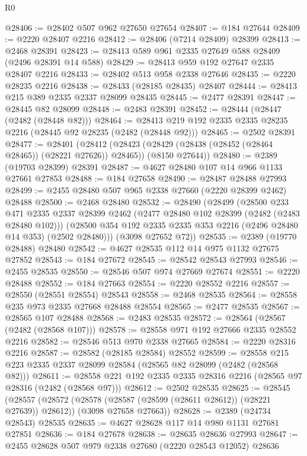 \begin{lexlean}{R0}
\begin{coremodule}
@28406 := @28402 @507 @962 @27650 @27654
@28407 := @184 @27644
@28409 := @2220 @28407 @2216
@28412 := @28406 (@7214 @28409) @28399
@28413 := @2468 @28391
@28423 := @28413 @589 @961 @2335 @27649 @588 @28409 (@2496 @28391 @14 @588)
@28429 := @28413 @959 @192 @27647 @2335 @28407 @2216
@28433 := @28402 @513 @958 @2338 @27646
@28435 := @2220 @28235 @2216
@28438 := @28433 (@28185 @28435) @28407
@28444 := @28413 @215 @389 @2335 @2337 @28099 @28435
@28445 := @2477 @28391
@28447 := @28445 @82 @28099
@28448 := @2483 @28391
@28452 := @28444 (@28447 (@2482 (@28448 @82)))
@28464 := @28413 @219 @192 @2335 @2335 @28235 @2216 (@28445 @92 @28235 (@2482 (@28448 @92)))
@28465 := @2502 @28391
@28477 := @28401
    (@28412
      (@28423 (@28429 (@28438 (@28452 (@28464 @28465)) (@28221 @27626)) @28465))
      (@8150 @27644))
@28480 := @2389 (@19703 @28399) @28391
@28487 := @4627 @28480 @107 @14 @966 @1133 @27661 @27853
@28488 := @184 @27658
@28490 := @28487 @28488 @27993
@28499 := @2455 @28480 @507 @965 @2338 @27660 (@2220 @28399 @2462) @28488
@28500 := @2468 @28480
@28532 := @28490
    (@28499
      (@28500
        @233
        @471
        @2335
        @2337
        @28399
        @2462
        (@2477 @28480 @102 @28399 (@2482 (@2483 @28480 @102)))
        (@28500 @354 @192 @2335 @2335 @353 @2216 (@2496 @28480 @14 @353) (@2502 @28480)))
      (@3098 @27652 @72))
@28535 := @2389 (@19770 @28488) @28480
@28542 := @4627 @28535 @112 @14 @975 @1132 @27675 @27852
@28543 := @184 @27672
@28545 := @28542 @28543 @27993
@28546 := @2455 @28535
@28550 := @28546 @507 @974 @27669 @27674
@28551 := @2220 @28488
@28552 := @184 @27663
@28554 := @2220 @28552 @2216
@28557 := @28550 (@28551 @28554) @28543
@28558 := @2468 @28535
@28564 := @28558 @235 @973 @2335 @27668 @28488 @28554
@28565 := @2477 @28535
@28567 := @28565 @107 @28488
@28568 := @2483 @28535
@28572 := @28564 (@28567 (@2482 (@28568 @107)))
@28578 := @28558 @971 @192 @27666 @2335 @28552 @2216
@28582 := @28546 @513 @970 @2338 @27665
@28584 := @2220 @28316 @2216
@28587 := @28582 (@28185 @28584) @28552
@28599 := @28558 @215 @223 @2335 @2337 @28099 @28584 (@28565 @82 @28099 (@2482 (@28568 @82)))
@28611 := @28558 @221 @192 @2335 @2335 @28316 @2216 (@28565 @97 @28316 (@2482 (@28568 @97)))
@28612 := @2502 @28535
@28625 := @28545
    (@28557
      (@28572 (@28578 (@28587 (@28599 (@28611 @28612)) (@28221 @27639)) @28612))
      (@3098 @27658 @27663))
@28628 := @2389 (@24734 @28543) @28535
@28635 := @4627 @28628 @117 @14 @980 @1131 @27681 @27851
@28636 := @184 @27678
@28638 := @28635 @28636 @27993
@28647 := @2455 @28628 @507 @979 @2338 @27680 (@2220 @28543 @12052) @28636

\end{coremodule}
\end{lexlean}
